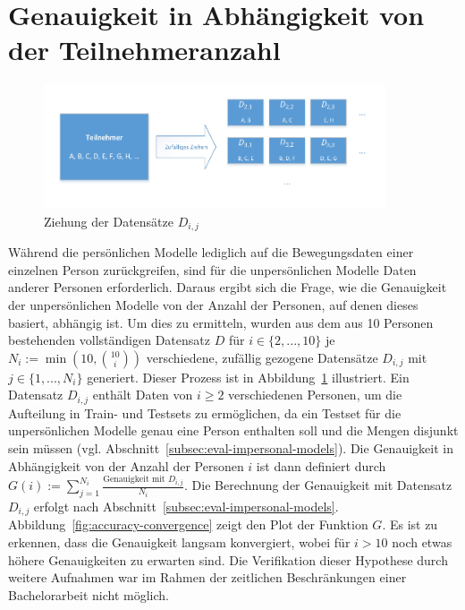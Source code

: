 \newpage

\section{Genauigkeit in Abhängigkeit von der Teilnehmeranzahl}
\label{sec:accuracy-usercount}
\begin{figure}
\centering
\includegraphics[clip, trim=7mm 7mm 7mm 6mm, width=0.9\textwidth]{img/random-set-draw}
\caption{Ziehung der Datensätze $D_{i,j}$}
\label{fig:random-set-draw}
\end{figure}

Während die persönlichen Modelle lediglich auf die Bewegungsdaten einer einzelnen Person zurückgreifen, sind für die unpersönlichen Modelle Daten anderer Personen erforderlich. Daraus ergibt sich die Frage, wie die Genauigkeit der unpersönlichen Modelle von der Anzahl der Personen, auf denen dieses basiert, abhängig ist. Um dies zu ermitteln, wurden aus dem aus 10 Personen bestehenden vollständigen Datensatz $D$ für $i \in \{2, ..., 10\}$ je $N_i := \min(10, \binom{10}{i})$ verschiedene, zufällig gezogene Datensätze $D_{i,j}$ mit $j \in \{1, ..., N_i\}$ generiert. Dieser Prozess ist in Abbildung~\ref{fig:random-set-draw} illustriert. Ein Datensatz $D_{i,j}$ enthält Daten von $i \geq 2$ verschiedenen Personen, um die Aufteilung in Train- und Testsets zu ermöglichen, da ein Testset für die unpersönlichen Modelle genau eine Person enthalten soll und die Mengen disjunkt sein müssen (vgl. Abschnitt~\ref{subsec:eval-impersonal-models}). Die Genauigkeit in Abhängigkeit von der Anzahl der Personen $i$ ist dann definiert durch $G(i) := \sum_{j=1}^{N_i} \frac{\text{Genauigkeit mit } D_{i,j}}{N_i}$. Die Berechnung der Genauigkeit mit Datensatz $D_{i,j}$ erfolgt nach Abschnitt~\ref{subsec:eval-impersonal-models}.
Abbildung~\ref{fig:accuracy-convergence} zeigt den Plot der Funktion $G$. Es ist zu erkennen, dass die Genauigkeit langsam konvergiert, wobei für $i > 10$ noch etwas höhere Genauigkeiten zu erwarten sind. Die Verifikation dieser Hypothese durch weitere Aufnahmen war im Rahmen der zeitlichen Beschränkungen einer Bachelorarbeit nicht möglich.

